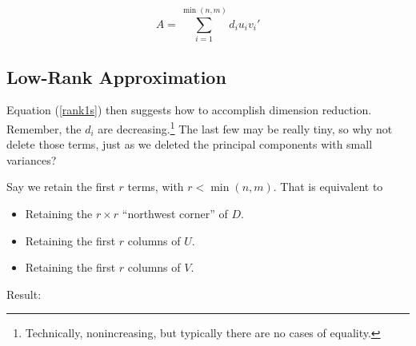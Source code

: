 \begin{equation}
\label{rank1s}
A = \sum_{i=1}^{\min(n,m)} d_i  u_i v_i'
\end{equation}

% 

\subsection{Low-Rank Approximation}

Equation (\ref{rank1s}) then suggests how to accomplish dimension
reduction.  Remember, the $d_i$ are decreasing.\footnote{Technically,
nonincreasing, but typically there are no cases of equality.}  The last
few may be really tiny, so why not delete those terms, just as we
deleted the principal components with small variances?

Say we retain the first $r$ terms, with $r < \min(n,m)$.  That is
equivalent to

\begin{itemize}

\item Retaining the $r \times r$ ``northwest corner'' of $D$.

\item Retaining the first $r$ columns of $U$.

\item Retaining the first $r$ columns of $V$.

\end{itemize} 

Result:

